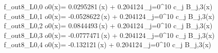 f_{out8_L0,0	o0}(x)= 0.0295281\,\phi(x) + 0.204124\,\sum_{j=0}^{10} c_j B_{j,3}(x)
f_{out8_L0,1	o0}(x)= -0.0528622\,\phi(x) + 0.204124\,\sum_{j=0}^{10} c_j B_{j,3}(x)
f_{out8_L0,2	o0}(x)= 0.0844493\,\phi(x) + 0.204124\,\sum_{j=0}^{10} c_j B_{j,3}(x)
f_{out8_L0,3	o0}(x)= -0.0777471\,\phi(x) + 0.204124\,\sum_{j=0}^{10} c_j B_{j,3}(x)
f_{out8_L0,4	o0}(x)= -0.132121\,\phi(x) + 0.204124\,\sum_{j=0}^{10} c_j B_{j,3}(x)
